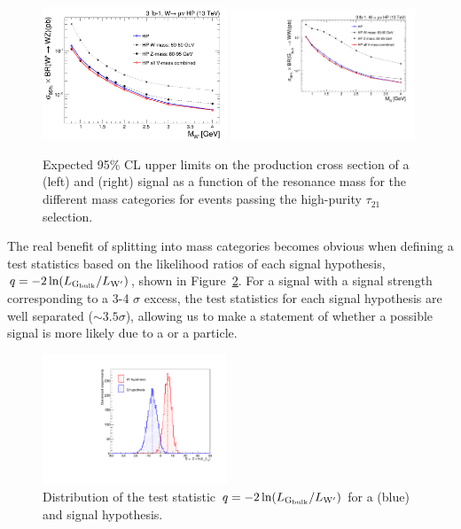 \begin{figure}[h!]
 \centering
 \includegraphics[width=0.49\textwidth]{figures/analysis/search1/AN-15-196/massCategories/compare-HP-HPV-Wprime.png}
  \includegraphics[width=0.49\textwidth]{figures/analysis/search1/AN-15-196/massCategories/compare-HP-HPV-BulkG.pdf}
 \caption{Expected 95\% CL upper limits on the production cross section of a \PWpr (left) and \BulkG (right) signal as a function of the resonance mass for the different mass categories for events passing the high-purity $\tau_{21}$ selection.}
 \label{fig:searchI:massCategories}
 \end{figure}
 The real benefit of splitting into mass categories becomes obvious when defining a test statistics based on the likelihood ratios of each signal hypothesis, $q = -2 \ln(L_{\mathrm{G}_\mathrm{bulk}}/L_{\mathrm{W}^\prime})$, shown in Figure~\ref{fig:searchI:signalsep}. For a signal with a signal strength corresponding to a 3-4 $\sigma$ excess, the test statistics for each signal hypothesis are well separated ($\sim3.5 \sigma$), allowing us to make a statement of whether a possible signal is more likely due to a \BulkG or a \PWpr particle.
\begin{figure}[h!]
 \centering
 \includegraphics[width=0.49\textwidth]{figures/analysis/search1/AN-15-196/massCategories/sig_sep.pdf}
 \caption{Distribution of the test statistic  $q = -2 \ln(L_{\mathrm{G}_\mathrm{bulk}}/L_{\mathrm{W}^\prime})$ for a \BulkG (blue) and \PWpr signal hypothesis.}
 \label{fig:searchI:signalsep}
 \end{figure}
